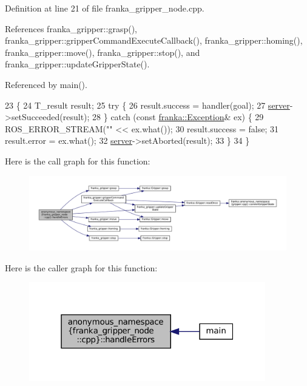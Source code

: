 Definition at line 21 of file franka\+\_\+gripper\+\_\+node.\+cpp.



References franka\+\_\+gripper\+::grasp(), franka\+\_\+gripper\+::gripper\+Command\+Execute\+Callback(), franka\+\_\+gripper\+::homing(), franka\+\_\+gripper\+::move(), franka\+\_\+gripper\+::stop(), and franka\+\_\+gripper\+::update\+Gripper\+State().



Referenced by main().


\begin{DoxyCode}
23                                       \{
24   T\_result result;
25   \textcolor{keywordflow}{try} \{
26     result.success = handler(goal);
27     \hyperlink{namespaceinteractive__marker_a0913a920340099e56f9b000d508380eb}{server}->setSucceeded(result);
28   \} \textcolor{keywordflow}{catch} (\textcolor{keyword}{const} \hyperlink{structfranka_1_1Exception}{franka::Exception}& ex) \{
29     ROS\_ERROR\_STREAM(\textcolor{stringliteral}{""} << ex.what());
30     result.success = \textcolor{keyword}{false};
31     result.error = ex.what();
32     \hyperlink{namespaceinteractive__marker_a0913a920340099e56f9b000d508380eb}{server}->setAborted(result);
33   \}
34 \}
\end{DoxyCode}
Here is the call graph for this function\+:
\nopagebreak
\begin{figure}[H]
\begin{center}
\leavevmode
\includegraphics[width=350pt]{namespaceanonymous__namespace_02franka__gripper__node_8cpp_03_a303e12e3dde7803ab11935d394c258c7_cgraph}
\end{center}
\end{figure}
Here is the caller graph for this function\+:
\nopagebreak
\begin{figure}[H]
\begin{center}
\leavevmode
\includegraphics[width=292pt]{namespaceanonymous__namespace_02franka__gripper__node_8cpp_03_a303e12e3dde7803ab11935d394c258c7_icgraph}
\end{center}
\end{figure}
